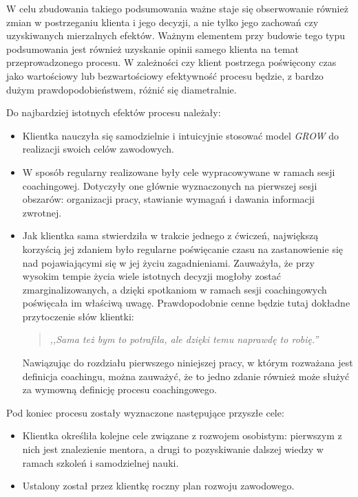 W celu zbudowania takiego podsumowania ważne staje się obserwowanie również zmian w postrzeganiu klienta i jego decyzji, a nie tylko jego zachowań
czy uzyskiwanych mierzalnych efektów. Ważnym elementem przy budowie tego typu podsumowania jest również uzyskanie opinii samego klienta na temat
przeprowadzonego procesu. W zależności czy klient postrzega poświęcony czas jako wartościowy lub bezwartościowy efektywność procesu będzie,
z bardzo dużym prawdopodobieństwem, różnić się diametralnie.

Do najbardziej istotnych efektów procesu należały:
\begin{itemize}
  \item Klientka nauczyła się samodzielnie i intuicyjnie stosować model \emph{GROW} do realizacji swoich celów zawodowych.
  \item W sposób regularny realizowane były cele wypracowywane w ramach sesji coachingowej. Dotyczyły one głównie wyznaczonych na
      pierwszej sesji obszarów: organizacji pracy, stawianie wymagań i dawania informacji zwrotnej.
  \item Jak klientka sama stwierdziła w trakcie jednego z ćwiczeń, największą korzyścią jej zdaniem było regularne poświęcanie czasu na zastanowienie
      się nad pojawiającymi się w jej życiu zagadnieniami. Zauważyła, że przy wysokim tempie życia wiele istotnych decyzji mogłoby zostać zmarginalizowanych,
      a dzięki spotkaniom w ramach sesji coachingowych poświęcała im właściwą uwagę. Prawdopodobnie cenne będzie tutaj dokładne przytoczenie słów klientki:
      \begin{quote}
      \centering
      \emph{,,Sama też bym to potrafiła, ale dzięki temu naprawdę to robię.''}
      \end{quote}
      Nawiązując do rozdziału pierwszego niniejszej pracy, w którym rozważana jest definicja coachingu, można zauważyć, że to jedno zdanie również
      może służyć za wymowną definicję procesu coachingowego.
\end{itemize}

Pod koniec procesu zostały wyznaczone następujące przyszłe cele:
\begin{itemize}
  \item Klientka określiła kolejne cele związane z rozwojem osobistym: pierwszym z nich jest znalezienie mentora, a drugi to pozyskiwanie dalszej wiedzy
      w ramach szkoleń i samodzielnej nauki.
  \item Ustalony został przez klientkę roczny plan rozwoju zawodowego.
\end{itemize}

